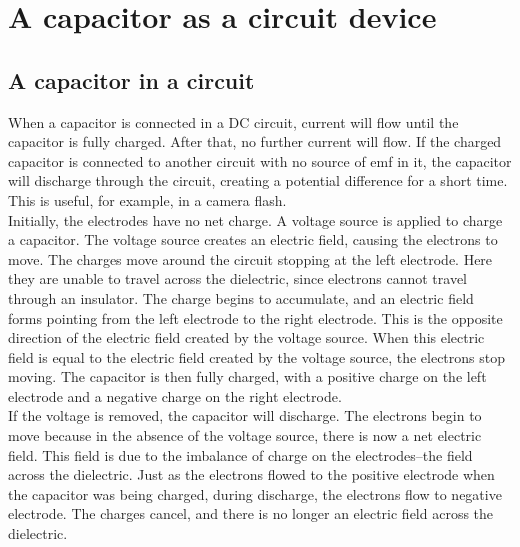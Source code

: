 \section{A capacitor as a circuit device}

\subsection{A capacitor in a circuit}
When a capacitor is connected in a DC circuit, current will flow
until the capacitor is fully charged. After that, no further
current will flow. If the charged capacitor is connected to
another circuit with no source of emf in it, the capacitor will
discharge through the circuit, creating a potential difference for
a short time. This is useful, for example, in a camera flash.\\

Initially, the electrodes have no net charge.  A
voltage source is applied to charge a capacitor.  The voltage source creates an electric
field, causing the electrons to move. The charges move around the
circuit stopping at the left electrode.  Here they are unable to
travel across the dielectric, since electrons cannot travel
through an insulator. The charge begins to accumulate, and an
electric field forms pointing from the left electrode to the right
electrode.  This is the opposite direction of the electric field
created by the voltage source. When this electric field is equal
to the electric field created by the voltage source, the electrons
stop moving.  The capacitor is then fully charged, with a positive
charge on the left electrode and a negative charge on the right
electrode.\\

If the voltage is removed, the capacitor will discharge.  The
electrons begin to move because in the absence of the voltage
source, there is now a net electric field.  This field is due to
the imbalance of charge on the electrodes--the field across the
dielectric. Just as the electrons flowed to the positive electrode
when the capacitor was being charged, during discharge, the
electrons flow to negative electrode.  The charges cancel, and
there is no longer an electric field across the dielectric.

